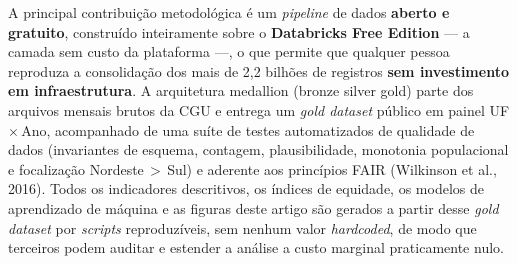 \documentclass[12pt,a4paper,oneside]{article}
\begin{document}
A principal contribuição metodológica é um \textit{pipeline} de dados
\textbf{aberto e gratuito}, construído inteiramente sobre o
\textbf{Databricks Free Edition} --- a camada sem custo da plataforma ---,
o que permite que qualquer pessoa reproduza a consolidação dos mais de
2,2 bilhões de registros \textbf{sem investimento em infraestrutura}.
A arquitetura medallion (bronze \textrightarrow{} silver
\textrightarrow{} gold) parte dos arquivos mensais brutos da CGU e
entrega um \textit{gold dataset} público em painel UF\,$\times$\,Ano,
acompanhado de uma suíte de testes automatizados de qualidade de dados
(invariantes de esquema, contagem, plausibilidade, monotonia
populacional e focalização Nordeste\,$>$\,Sul) e aderente aos
princípios FAIR (Wilkinson et al., 2016). Todos os indicadores
descritivos, os índices de equidade, os modelos de aprendizado de
máquina e as figuras deste artigo são gerados a partir desse
\textit{gold dataset} por \textit{scripts} reproduzíveis, sem nenhum
valor \textit{hardcoded}, de modo que terceiros podem auditar e
estender a análise a custo marginal praticamente nulo.

\end{document}
